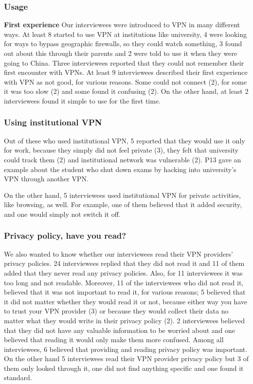 \subsubsection{Usage}
\textbf{First experience}
Our interviewees were introduced to VPN in many different ways. At least 8 started to use VPN at institutions like university, 4 were looking for ways to bypass geographic firewalls, so they could watch something, 3 found out about this through their parents and 2 were told to use it when they were going to China. Three interviewees reported that they could not remember their first encounter with VPNs.  
At least 9 interviewees described their first experience with VPN as not good, for various reasons. Some could not connect (2), for some it was too slow (2) and some found it confusing (2).  On the other hand, at least 2 interviewees found it simple to use for the first time.



\subsubsection{Using institutional VPN} 
Out of these who used institutional VPN, 5 reported that they would use it only for work, because they simply did not feel private (3), they felt that university
could track them (2) and institutional network was vulnerable  (2). P13 gave an example about the student who shut down exams by hacking into university's VPN through another VPN. %

On the other hand, 5 interviewees used institutional VPN for private activities, like browsing, as well. For example, one of them believed that it added security, and one would simply not switch it off. 

\subsubsection{Privacy policy, have you read?}
We also wanted to know whether our interviewees read their VPN providers’ privacy policies. 24 interviewees replied that they did not read it and 11 of them added that they never read any privacy policies. Also, for 11 interviewees it was too long and not readable. Moreover, 11 of the interviewees who did not read it, believed that it was not important to read it, for various reasons; 5 believed that it did not matter whether they would read it or not, because either way you have to trust your VPN provider (3) or because they would collect their data no matter what they would write in their privacy policy (2). 2 interviewees believed that they did not have any valuable information to be worried about and one believed that reading it would only make them more confused. Among all interviewees, 6 believed that providing and reading privacy policy was important. On the other hand 5 interviewees read their VPN provider privacy policy but 3 of them only looked through it, one did not find anything specific and one found it standard. 

